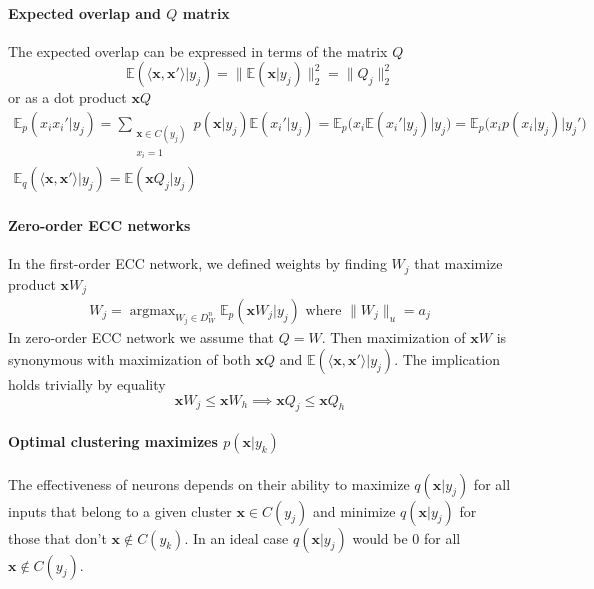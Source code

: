 \documentclass[12pt]{article}
\DeclareMathOperator*{\argmax}{argmax}
\begin{document}
\paragraph{Expected overlap and $Q$ matrix} 
The expected overlap can be expressed in terms of the matrix $Q$
\[
\mathbb{E}(\langle \boldsymbol{x}, \boldsymbol{x}'\rangle|y_j) = \lVert \mathbb{E}(\boldsymbol{x}|y_j) \rVert_2^2 =  \lVert Q_j \rVert_2^2
\]
or as a dot product $\boldsymbol{x}Q$
\begin{gather*}
	\mathbb{E}_p(x_i x_i' | y_j) = 
	\sum_{\substack{\boldsymbol{x}\in C(y_j) \\ x_i=1}} p(\boldsymbol{x}|y_j) \mathbb{E}(x_i'|y_j)= \mathbb{E}_p\big(x_i \mathbb{E}(x_i'|y_j) \big| y_j\big) = \mathbb{E}_p\big(x_i p(x_i|y_j) \big| y_j'\big)\\
	\mathbb{E}_q(\langle \boldsymbol{x}, \boldsymbol{x}'\rangle|y_j) = \mathbb{E}(\boldsymbol{x} Q_j | y_j)
\end{gather*}

\paragraph{Zero-order ECC networks}
In the first-order ECC network, we defined weights by finding $W_j$ that maximize product $\boldsymbol{x}W_j$
\begin{gather*}
	W_j = \argmax_{W_j\in D_W^{n}} \mathbb{E}_p(\boldsymbol{x}W_j|y_j)\text{ where } \lVert W_j \rVert_u=a_j
\end{gather*}
In zero-order ECC network we assume that $Q=W$. Then maximization of $\boldsymbol{x}W$ is synonymous with maximization of both $\boldsymbol{x}Q$ and $\mathbb{E}(\langle \boldsymbol{x}, \boldsymbol{x}'\rangle|y_j) $. 
The implication holds trivially by equality
\[
\boldsymbol{x}W_j \le \boldsymbol{x}W_h  \implies  \boldsymbol{x}Q_j \le \boldsymbol{x}Q_h 
\]
\iffalse
\paragraph{Optimal clustering maximizes $p(\boldsymbol{x}|y_k)$} 
The effectiveness of neurons depends on their ability to maximize $q(\boldsymbol{x}|y_j)$ for all inputs that belong to a given cluster $\boldsymbol{x}\in C(y_j)$ and minimize $q(\boldsymbol{x}|y_j)$ for those that don't  $\boldsymbol{x}\notin C(y_k)$. In an ideal case $q(\boldsymbol{x}|y_j)$ would be $0$ for all $\boldsymbol{x}\notin C(y_j)$. 
\end{document}
